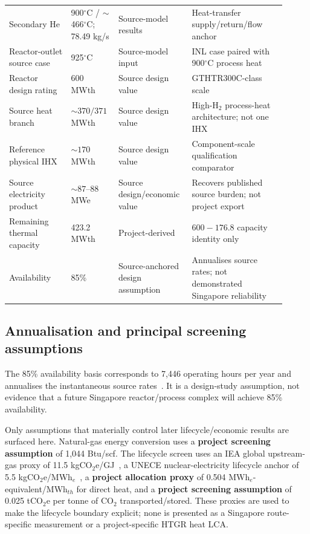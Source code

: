 \begin{table}[htbp]
\begin{tabular}{p{0.21\linewidth}p{0.16\linewidth}p{0.22\linewidth}p{0.32\linewidth}}
Secondary He & 900$^\circ$C / $\sim$466$^\circ$C; 78.49 kg/s & Source-model results & Heat-transfer supply/return/flow anchor~\cite{inltev961} \\
Reactor-outlet source case & 925$^\circ$C & Source-model input & INL case paired with 900$^\circ$C process heat~\cite{inltev961} \\
Reactor design rating & 600 MWth & Source design value & GTHTR300C-class scale~\cite{nishihara2007potential} \\
Source heat branch & $\sim370/371$ MWth & Source design value & High-H$_2$ process-heat architecture; not one IHX~\cite{nishihara2007potential} \\
Reference physical IHX & $\sim170$ MWth & Source design value & Component-scale qualification comparator~\cite{jaeri2004gthtr300c,nishihara2007potential} \\
Source electricity product & $\sim87$--$88$ MWe & Source design/economic value & Recovers published source burden; not project export~\cite{nishihara2007potential} \\
Remaining thermal capacity & 423.2 MWth & Project-derived & $600-176.8$ capacity identity only \\
Availability & 85\% & Source-anchored design assumption & Annualises source rates; not demonstrated Singapore reliability~\cite{nishihara2007potential} \\
\bottomrule
\end{tabular}
\end{table}

\subsection{Annualisation and principal screening assumptions}
The 85\% availability basis corresponds to 7,446 operating hours per year and annualises the instantaneous source rates~\cite{nishihara2007potential}. It is a design-study assumption, not evidence that a future Singapore reactor/process complex will achieve 85\% availability.

Only assumptions that materially control later lifecycle/economic results are surfaced here. Natural-gas energy conversion uses a \textbf{project screening assumption} of 1,044 Btu/scf. The lifecycle screen uses an IEA global upstream-gas proxy of 11.5 kgCO$_2$e/GJ~\cite{iea2026lng}, a UNECE nuclear-electricity lifecycle anchor of 5.5 kgCO$_2$e/MWh$_e$~\cite{unece2022lca}, a \textbf{project allocation proxy} of 0.504 MWh$_e$-equivalent/MWh$_{th}$ for direct heat, and a \textbf{project screening assumption} of 0.025 tCO$_2$e per tonne of CO$_2$ transported/stored. These proxies are used to make the lifecycle boundary explicit; none is presented as a Singapore route-specific measurement or a project-specific HTGR heat LCA.

